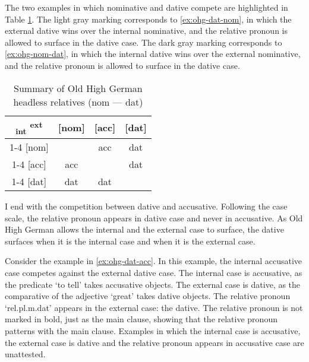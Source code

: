 The two examples in which nominative and dative compete are highlighted in Table \ref{tbl:summary-old-high-german-nom-dat}. The light gray marking corresponds to \ref{ex:ohg-dat-nom}, in which the external dative wins over the internal nominative, and the relative pronoun is allowed to surface in the dative case. The dark gray marking corresponds to \ref{ex:ohg-nom-dat}, in which the internal dative wins over the external nominative, and the relative pronoun is allowed to surface in the dative case.

\begin{table}[H]
  \center
  \caption{Summary of Old High German headless relatives (\ac{nom} --- \ac{dat})}
  \begin{tabular}{c|c|c|c}
    \toprule
        \textsubscript{\ac{int}} \textsuperscript{\ac{ext}}
          & [\ac{nom}]
          & [\ac{acc}]
          & [\ac{dat}]
          \\ \cmidrule{1-4}
      [\ac{nom}]
          & \xcancel{\phantom{xx}}
          & \ac{acc}
          & \cellcolor{LG}\ac{dat}
          \\ \cmidrule{1-4}
      [\ac{acc}]
          & \ac{acc}
          & \xcancel{\phantom{xx}}
          & \ac{dat}
          \\ \cmidrule{1-4}
      [\ac{dat}]
          & \cellcolor{DG}\ac{dat}
          & \ac{dat}
          & \xcancel{\phantom{xx}}
          \\
    \bottomrule
  \end{tabular}
    \label{tbl:summary-old-high-german-nom-dat}
\end{table}

I end with the competition between dative and accusative. Following the case scale, the relative pronoun appears in dative case and never in accusative. As Old High German allows the internal and the external case to surface, the dative surfaces when it is the internal case and when it is the external case.

Consider the example in \ref{ex:ohg-dat-acc}. In this example, the internal accusative case competes against the external dative case.
The internal case is accusative, as the predicate  `to tell' takes accusative objects.
The external case is dative, as the comparative of the adjective  `great' takes dative objects.
The relative pronoun  `\ac{rel}.\ac{pl}.\ac{m}.\ac{dat}' appears in the external case: the dative. The relative pronoun is not marked in bold, just as the main clause, showing that the relative pronoun patterns with the main clause.
Examples in which the internal case is accusative, the external case is dative and the relative pronoun appears in accusative case are unattested.

